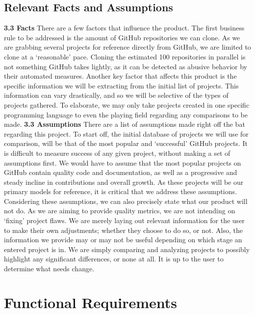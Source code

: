 \documentclass{article}
\begin{document}
\subsection{Relevant Facts and Assumptions}
\textbf{3.3 Facts}
\newline
There are a few factors that influence the product. The first business rule to be addressed is the amount of GitHub repositories we can clone. As we are grabbing several projects for reference directly from GitHub, we are limited to clone at a ‘reasonable’ pace. Cloning the estimated 100 repositories in parallel is not something GitHub takes lightly, as it can be detected as abusive behavior by their automated measures. Another key factor that affects this product is the specific information we will be extracting from the initial list of projects. This information can vary drastically, and so we will be selective of the types of projects gathered. To elaborate, we may only take projects created in one specific programming language to even the playing field regarding any comparisons to be made.
\newline
\newline 
\textbf{3.3 Assumptions}
\newline
There are a list of assumptions made right off the bat regarding this project. To start off, the initial database of projects we will use for comparison, will be that of the most popular and ‘successful’ GitHub projects. It is difficult to measure success of any given project, without making a set of assumptions first. We would have to assume that the most popular projects on GitHub contain quality code and documentation, as well as a progressive and steady incline in contributions and overall growth.  As these projects will be our primary models for reference, it is critical that we address these assumptions.
Considering these assumptions, we can also precisely state what our product will not do. As we are aiming to provide quality metrics, we are not intending on ‘fixing’ project flaws. We are merely laying out relevant information for the user to make their own adjustments; whether they choose to do so, or not. Also, the information we provide may or may not be useful depending on which stage an entered project is in. We are simply comparing and analyzing projects to possibly highlight any significant differences, or none at all. It is up to the user to determine what needs change. 

\newpage
\section{Functional Requirements}
\end{document}
